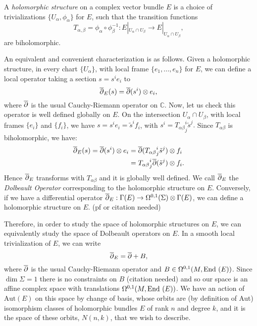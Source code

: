 	\begin{definition}
		A \textit{holomorphic structure} on a complex vector bundle $E$ is a choice of trivializations $\{U_\alpha, \phi_\alpha\}$ for $E$, such that the transition functions
		\begin{equation*}
		T_{\alpha,\beta} = \phi_\alpha \circ \phi^{-1}_\beta: E|_{U_\alpha \cap U_\beta} \to E|_{U_\alpha \cap U_\beta},
		\end{equation*}
		are biholomorphic. 
	\end{definition}
	An equivalent and convenient characterization is as follows. Given a holomorphic structure, in every chart $\{U_\alpha\}$, with local frame $\{e_1,...,e_n\}$ for $E$, we can define a local operator taking a section $s = s^i e_i$ to
	\begin{equation*}
	\overline{\partial}_E(s) = \overline{\partial}(s^i)\otimes e_i,
	\end{equation*}
	where $\overline{\partial}$ is the usual Cauchy-Riemann operator on $\mathbb{C}$. Now, let us check this operator is well defined globally on $E$. On the intersection $U_\alpha \cap U_\beta$, with local frames $\{e_i\}$ and $\{f_i\}$, we have $s = s^i e_i = \tilde{s}^i f_i$, with $s^i = {T_{\alpha\beta}}^i_j\tilde{s}^j.$ Since $T_{\alpha\beta}$ is biholomorphic, we have:
	\begin{align*}
	\overline{\partial}_E(s) = \overline{\partial}(s^i)\otimes e_i &= \overline{\partial}({T_{\alpha\beta}}^i_j \tilde{s}^j)\otimes f_i\\
	&= {T_{\alpha\beta}}^i_j \overline{\partial}(\tilde{s}^j)\otimes f_i.
	\end{align*}
	Hence $\overline{\partial}_E$ transforms with $T_{\alpha\beta}$ and it is globally well defined. We call $\overline{\partial}_E$ the \textit{Dolbeault Operator} corresponding to the holomorphic structure on $E$. Conversely, if we have a differential operator $\overline{\partial}_E:\Gamma(E) \to \Omega^{0,1}(\Sigma)\otimes \Gamma(E)$, we can define a holomorphic structure on $E$. (pf or citation needed)
	
	Therefore, in order to study the space of holomorphic structures on $E$, we can equivalently study the space of Dolbeault operators on $E$. In a smooth local trivialization of $E$, we can write 
	\begin{equation*}
	\overline{\partial}_E = \overline{\partial} + B,
	\end{equation*}
	where $\overline{\partial}$ is the usual Cauchy-Riemann operator and $B \in \Omega^{0,1}(M, \text{End }(E))$. Since $\dim \Sigma = 1$ there is no constraints on $B$ (citation needed) and so our space is an affine complex space with translations $\Omega^{0,1}(M,\text{End }(E))$. We have an action of $\text{Aut}(E)$ on this space by change of basis, whose orbits are (by definition of Aut) isomorphism classes of holomorphic bundles $E$ of rank $n$ and degree $k$, and it is the space of these orbits, $N(n,k)$, that we wish to describe. 
	
